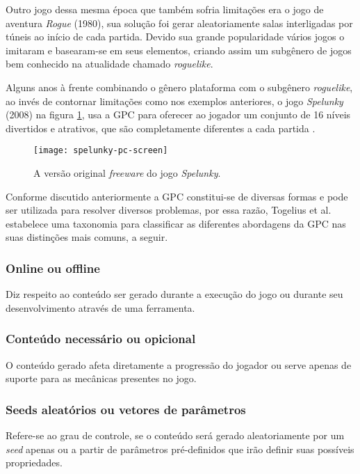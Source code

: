 \documentclass[10pt, conference, compsocconf]{IEEEtran}
\begin{document}
Outro jogo dessa mesma época que também sofria limitações era o jogo de aventura \textit{Rogue} (1980), sua solução foi gerar aleatoriamente salas interligadas por túneis ao início de cada partida. Devido sua grande popularidade vários jogos o imitaram e basearam-se em seus elementos, criando assim um subgênero de jogos bem conhecido na atualidade chamado \textit{roguelike}.

Alguns anos à frente combinando o gênero plataforma com o subgênero \textit{roguelike}, ao invés de contornar limitações como nos exemplos anteriores, o jogo \textit{Spelunky} (2008) na figura \ref{fig:spelunky-pc-screen}, usa a GPC para oferecer ao jogador um conjunto de 16 níveis divertidos e atrativos, que são completamente diferentes a cada partida \parencite{yu2016spelunky}.

\begin{figure}[ht]
    \centering
    \texttt{[image: spelunky-pc-screen]}
    \caption{A versão original \textit{freeware} do jogo \textit{Spelunky}.}
    \label{fig:spelunky-pc-screen}
\end{figure}

Conforme discutido anteriormente a GPC constitui-se de diversas formas e pode ser utilizada para resolver diversos problemas, por essa razão, Togelius et al. \parencite{togelius2011taxonomy} estabelece uma taxonomia para classificar as diferentes abordagens da GPC nas suas distinções mais comuns, a seguir.

\subsubsection{Online ou offline}

Diz respeito ao conteúdo ser gerado durante a execução do jogo ou durante seu desenvolvimento através de uma ferramenta. 

\subsubsection{Conteúdo necessário ou opicional}

O conteúdo gerado afeta diretamente a progressão do jogador ou serve apenas de suporte para as mecânicas presentes no jogo.

\subsubsection{Seeds aleatórios ou vetores de parâmetros}

Refere-se ao grau de controle, se o conteúdo será gerado aleatoriamente por um \textit{seed} apenas ou a partir de parâmetros pré-definidos que irão definir suas possíveis propriedades.
\end{document}

